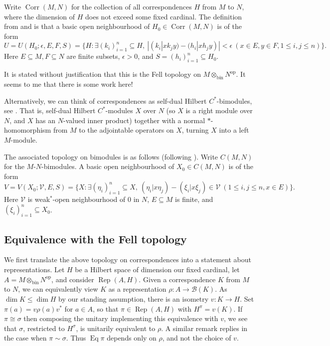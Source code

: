 \documentclass[a4paper,11pt]{article}
\newcommand{\mc}[1]{{\mathcal{#1}}}
\newcommand{\Rep}{\operatorname{Rep}}
\newcommand{\Eq}{\operatorname{Eq}}
\newcommand{\op}{{\operatorname{op}}}
\newcommand{\bin}{{\operatorname{bin}}}
\newcommand{\Corr}{{\operatorname{Corr}}}
\begin{document}
Write $\Corr(M,N)$ for the collection of all correspondences $H$ from $M$ to
$N$, where the dimension of $H$ does not exceed some fixed cardinal.
The definition from \cite{cj} and \cite[Section~1.12]{ad2} is that a basic
open neighbourhood of $H_0\in\Corr(M,N)$ is of the form
\[ U=U(H_0; \epsilon,E,F,S) =
\big\{ H : \exists (k_i)_{i=1}^n\subseteq H, \ 
|(k_i|xk_jy) - (h_i|xh_jy)|<\epsilon \ 
(x\in E, y\in F, 1\leq i,j\leq n)
\big\}. \]
Here $E\subseteq M, F\subseteq N$ are finite subsets, $\epsilon>0$, and
$S=(h_i)_{i=1}^n \subseteq H_0$.

It is stated without justification that this is the Fell topology on
$M\otimes_\bin N^\op$.  It seems to me that there is some work here!

Alternatively, we can think of correspondences as self-dual Hilbert 
$C^*$-bimodules, see \cite{ad1, ad2}.  That is, self-dual Hilbert $C^*$-modules
$X$ over $N$ (so $X$ is a right module over $N$, and $X$ has an $N$-valued
inner product) together with a normal $*$-homomorphism from $M$ to the
adjointable operators on $X$, turning $X$ into a left $M$-module.

The associated topology on bimodules is as follows (following
\cite[Section~1.12]{ad2}).  Write $C(M,N)$ for the $M$-$N$-bimodules.  A basic
open neighbourhood of $X_0\in C(M,N)$ is of the form
\[ V=V(X_0; \mc V, E,S) = \big\{
X : \exists(\eta_i)_{i=1}^n\subseteq X, \ 
(\eta_i|x\eta_j) - (\xi_i|x\xi_j) \in\mc V \ 
(1\leq i,j\leq n, x\in E)
\big\}. \]
Here $\mc V$ is weak$^*$-open neighbourhood of $0$ in $N$, $E\subseteq M$ is
finite, and $(\xi_i)_{i=1}^n \subseteq X_0$.


\subsection{Equivalence with the Fell topology}

We first translate the above topology on correspondences into a statement about
representations.  Let $H$ be a Hilbert space of dimension our fixed cardinal,
let $A = M \otimes_{\bin} N^\op$, and consider $\Rep(A,H)$.  Given a
correspondence $K$ from $M$ to $N$, we can equivalently view $K$ as a
representation $\rho : A\rightarrow\mc B(K)$.  As $\dim K\leq \dim H$ by our
standing assumption, there is an isometry $v:K\rightarrow H$.  Set $\pi(a)
= v\rho(a)v^*$ for $a\in A$, so that $\pi\in\Rep(A,H)$ with $H^\pi = v(K)$.
If $\pi\cong\sigma$ then composing the unitary implementing this equivalence
with $v$, we see that $\sigma$, restricted to $H^\sigma$, is unitarily
equivalent to $\rho$.  A similar remark replies in the case when $\pi\sim\sigma$.
Thus $\Eq\pi$ depends only on $\rho$, and not the choice of $v$.
\end{document}
